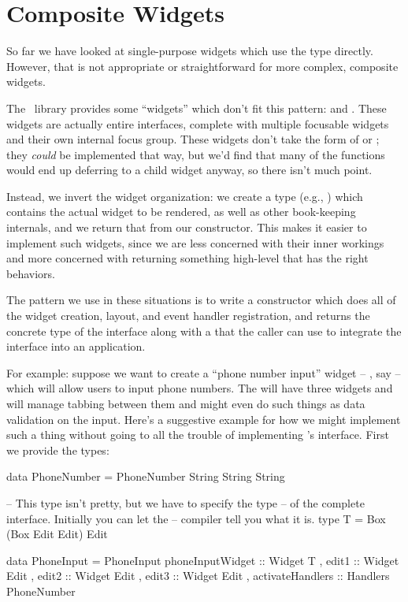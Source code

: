 \section{Composite Widgets}

So far we have looked at single-purpose widgets which use the
 type directly.  However, that is not appropriate or
straightforward for more complex, composite widgets.

The \vtyui\ library provides some ``widgets'' which don't fit this
pattern:  and .  These widgets are actually
entire interfaces, complete with multiple focusable widgets and their
own internal focus group.  These widgets don't take the form of
 or ; they \textit{could} be
implemented that way, but we'd find that many of the 
functions would end up deferring to a child widget anyway, so there
isn't much point.

Instead, we invert the widget organization: we create a type (e.g.,
) which contains the actual widget to be rendered, as well
as other book-keeping internals, and we return that from our
constructor.  This makes it easier to implement such widgets, since we
are less concerned with their inner workings and more concerned with
returning something high-level that has the right behaviors.

The pattern we use in these situations is to write a constructor which
does all of the widget creation, layout, and event handler
registration, and returns the concrete type of the interface along
with a  that the caller can use to integrate the
interface into an application.

For example: suppose we want to create a ``phone number input'' widget
-- , say -- which will allow users to input phone
numbers.  The  will have three  widgets and
will manage tabbing between them and might even do such things as data
validation on the input.  Here's a suggestive example for how we might
implement such a thing without going to all the trouble of
implementing 's interface.  First we provide the types:

\begin{haskellcode}
 data PhoneNumber = PhoneNumber String String String

 -- This type isn't pretty, but we have to specify the type
 -- of the complete interface.  Initially you can let the
 -- compiler tell you what it is.
 type T = Box (Box Edit Edit) Edit

 data PhoneInput =
   PhoneInput { phoneInputWidget :: Widget T
              , edit1 :: Widget Edit
              , edit2 :: Widget Edit
              , edit3 :: Widget Edit
              , activateHandlers :: Handlers PhoneNumber
              }
\end{haskellcode}

